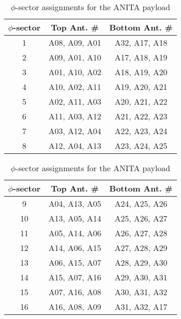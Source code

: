 \begin{table}
\caption{$\phi$-sector assignments for the ANITA payload}
{\footnotesize
\begin{minipage}[b]{0.3\columnwidth}
\begin{tabular}{| c | c | c |}\hline
$\phi$-sector & Top Ant. \# & Bottom Ant. \# \\
\hline \hline
1 & A08, A09, A01 & A32, A17, A18 \\
2 & A09, A01, A10 & A17, A18, A19 \\
3 & A01, A10, A02 & A18, A19, A20 \\
4 & A10, A02, A11 & A19, A20, A21 \\
5 & A02, A11, A03 & A20, A21, A22 \\
6 & A11, A03, A12 & A21, A22, A23 \\
7 & A03, A12, A04 & A22, A23, A24 \\
8 & A12, A04, A13 & A23, A24, A25 \\
\hline
\end{tabular}
\end{minipage}
\hspace{3.0cm}
\begin{minipage}[b]{0.3\columnwidth}
\begin{tabular}{| c | c | c |}\hline
$\phi$-sector & Top Ant. \# & Bottom Ant. \# \\
\hline \hline
9 & A04, A13, A05 & A24, A25, A26 \\
10 & A13, A05, A14 & A25, A26, A27 \\
11 & A05, A14, A06 & A26, A27, A28 \\
12 & A14, A06, A15 & A27, A28, A29 \\
13 & A06, A15, A07 & A28, A29, A30 \\
14 & A15, A07, A16 & A29, A30, A31 \\
15 & A07, A16, A08 & A30, A31, A32 \\
16 & A16, A08, A09 & A31, A32, A17 \\
\hline
\end{tabular}
\end{minipage}
\label{tab:phiSector}
}
%
\end{table}
